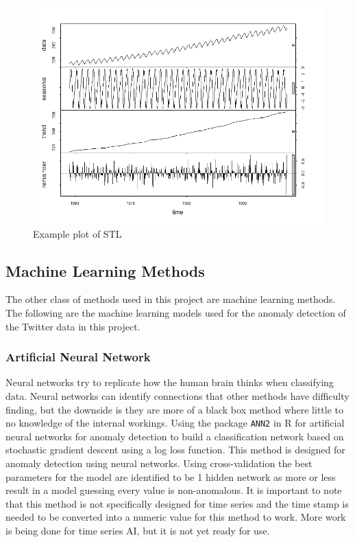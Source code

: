 \documentclass{article}
\begin{document}
\begin{figure}[!ht]
    \centering
    \includegraphics[width=.6\textwidth]{stl_model.png}
    \caption{Example plot of STL}
    \label{fig:stl_fig}
\end{figure}

\subsection{Machine Learning Methods}
The other class of methods used in this project are machine learning methods. The following are the machine learning models used for the anomaly detection of the Twitter data in this project.

\subsubsection{Artificial Neural Network}
Neural networks try to replicate how the human brain thinks when classifying data. Neural networks can identify connections that other methods have difficulty finding, but the downside is they are more of a black box method where little to no knowledge of the internal workings. Using the package \texttt{ANN2} in R for artificial neural networks for anomaly detection to build a classification network based on stochastic gradient descent using a log loss function. This method is designed for anomaly detection using neural networks. Using cross-validation the best parameters for the model are identified to be 1 hidden network as more or less result in a model guessing every value is non-anomalous. It is important to note that this method is not specifically designed for time series and the time stamp is needed to be converted into a numeric value for this method to work. More work is being done for time series AI, but it is not yet ready for use.
\end{document}

